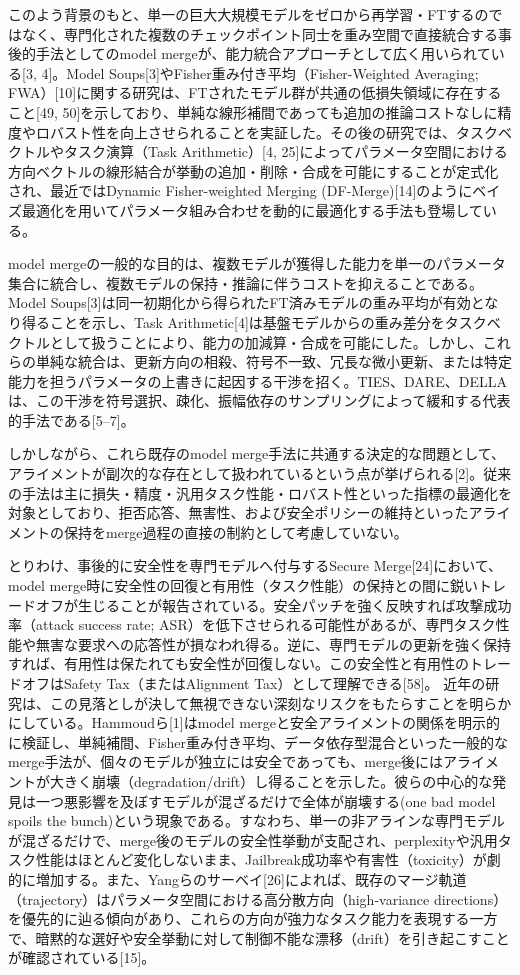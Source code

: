 \documentclass{article}
\begin{document}
このよう背景のもと、単一の巨大大規模モデルをゼロから再学習・FTするのではなく、専門化された複数のチェックポイント同士を重み空間で直接統合する事後的手法としてのmodel mergeが、能力統合アプローチとして広く用いられている[3, 4]。Model Soups[3]やFisher重み付き平均（Fisher-Weighted Averaging; FWA）[10]に関する研究は、FTされたモデル群が共通の低損失領域に存在すること[49, 50]を示しており、単純な線形補間であっても追加の推論コストなしに精度やロバスト性を向上させられることを実証した。その後の研究では、タスクベクトルやタスク演算（Task Arithmetic）[4, 25]によってパラメータ空間における方向ベクトルの線形結合が挙動の追加・削除・合成を可能にすることが定式化され、最近ではDynamic Fisher-weighted Merging (DF-Merge)[14]のようにベイズ最適化を用いてパラメータ組み合わせを動的に最適化する手法も登場している。

model mergeの一般的な目的は、複数モデルが獲得した能力を単一のパラメータ集合に統合し、複数モデルの保持・推論に伴うコストを抑えることである。Model Soups[3]は同一初期化から得られたFT済みモデルの重み平均が有効となり得ることを示し、Task Arithmetic[4]は基盤モデルからの重み差分をタスクベクトルとして扱うことにより、能力の加減算・合成を可能にした。しかし、これらの単純な統合は、更新方向の相殺、符号不一致、冗長な微小更新、または特定能力を担うパラメータの上書きに起因する干渉を招く。TIES、DARE、DELLAは、この干渉を符号選択、疎化、振幅依存のサンプリングによって緩和する代表的手法である[5--7]。

しかしながら、これら既存のmodel merge手法に共通する決定的な問題として、アライメントが副次的な存在として扱われているという点が挙げられる[2]。従来の手法は主に損失・精度・汎用タスク性能・ロバスト性といった指標の最適化を対象としており、拒否応答、無害性、および安全ポリシーの維持といったアライメントの保持をmerge過程の直接の制約として考慮していない。

とりわけ、事後的に安全性を専門モデルへ付与するSecure Merge[24]において、model merge時に安全性の回復と有用性（タスク性能）の保持との間に鋭いトレードオフが生じることが報告されている。安全パッチを強く反映すれば攻撃成功率（attack success rate; ASR）を低下させられる可能性があるが、専門タスク性能や無害な要求への応答性が損なわれ得る。逆に、専門モデルの更新を強く保持すれば、有用性は保たれても安全性が回復しない。この安全性と有用性のトレードオフはSafety Tax（またはAlignment Tax）として理解できる[58]。
近年の研究は、この見落としが決して無視できない深刻なリスクをもたらすことを明らかにしている。Hammoudら[1]はmodel mergeと安全アライメントの関係を明示的に検証し、単純補間、Fisher重み付き平均、データ依存型混合といった一般的なmerge手法が、個々のモデルが独立には安全であっても、merge後にはアライメントが大きく崩壊（degradation/drift）し得ることを示した。彼らの中心的な発見は一つ悪影響を及ぼすモデルが混ざるだけで全体が崩壊する(one bad model spoils the bunch)という現象である。すなわち、単一の非アラインな専門モデルが混ざるだけで、merge後のモデルの安全性挙動が支配され、perplexityや汎用タスク性能はほとんど変化しないまま、Jailbreak成功率や有害性（toxicity）が劇的に増加する。また、Yangらのサーベイ[26]によれば、既存のマージ軌道（trajectory）はパラメータ空間における高分散方向（high-variance directions）を優先的に辿る傾向があり、これらの方向が強力なタスク能力を表現する一方で、暗黙的な選好や安全挙動に対して制御不能な漂移（drift）を引き起こすことが確認されている[15]。
\end{document}
